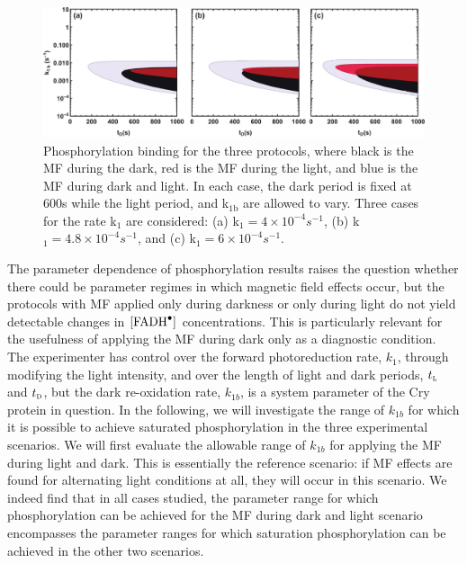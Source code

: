 \documentclass[twoside,twocolumn,9pt]{article}
\begin{document}
\begin{figure}[h]
	\centering
	\includegraphics[width = 2\columnwidth]{PhosK1bTD.pdf}
	\caption{Phosphorylation binding for the three protocols, where black is the MF during the dark, red is the MF during the
		light, and blue is the MF during dark and light. In each case, the dark period is fixed at 600s while the light period, and 
		k$_{1\text{b}}$ are allowed to vary. Three cases for the rate k$_{1}$ are considered: (a) k$_{1} = 4 \times 10^{-4} 
		s^{-1}$, (b) k$_{1} = 
		4.8 \times 10^{-4} s^{-1}$, and (c) k$_{1} = 6 \times 10^{-4} s^{-1}$.}
	\label{fig:PvsK1bTDark}
\end{figure}

The parameter dependence of phosphorylation results raises the question whether there could be parameter regimes in which magnetic
field effects occur, but the protocols with MF applied only during darkness or only during light do not yield detectable changes in
$[\ce{FADH^{.}}]$ concentrations. This is particularly relevant for the usefulness of applying the MF during dark only as a
diagnostic condition. The experimenter has control over the forward photoreduction rate, $k_{1}$, through modifying the light
intensity, and over the length of light and dark periods, $t_{\textsc{l}}$ and $t_{\textsc{d}}$, but the dark re-oxidation rate,
$k_{1b}$, is a system parameter of the Cry protein in question. In the following, we will investigate the range of $k_{1b}$ for
which it is possible to achieve saturated phosphorylation in the three experimental scenarios. We will first evaluate the allowable
range of $k_{1b}$ for applying the MF during light and dark. This is essentially the reference scenario: if MF effects are found for
alternating light conditions at all, they will occur in this scenario. We indeed find that in all cases studied, the parameter range
for which phosphorylation can be achieved for the MF during dark and light scenario encompasses the parameter ranges for which
saturation phosphorylation can be achieved in the other two scenarios.
\end{document}
